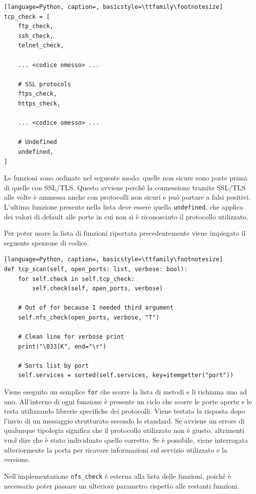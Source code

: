 \documentclass[12pt]{report}
\begin{document}
\begin{lstlisting}[language=Python, caption=, basicstyle=\ttfamily\footnotesize]
tcp_check = [
    ftp_check,
    ssh_check,
    telnet_check,
    
    ... <codice omesso> ...
    
    # SSL protocols
    ftps_check,
    https_check,
    
    ... <codice omesso> ...

    # Undefined
    undefined,
]
\end{lstlisting} 

Le funzioni sono ordinate nel seguente modo: quelle non sicure sono poste prima di quelle con SSL/TLS. Questo avviene perché la connessione tramite SSL/TLS alle volte è ammessa anche con protocolli non sicuri e può portare a falsi positivi. L'ultima funzione presente nella lista deve essere quella \lstinline{undefined}, che applica dei valori di default alle porte in cui non si è riconosciuto il protocollo utilizzato.

Per poter usare la lista di funzioni riportata precedentemente viene impiegato il seguente spezzone di codice.

\begin{lstlisting}[language=Python, caption=, basicstyle=\ttfamily\footnotesize]
def tcp_scan(self, open_ports: list, verbose: bool):
    for self.check in self.tcp_check:
        self.check(self, open_ports, verbose)

    # Out of for because I needed third argument
    self.nfs_check(open_ports, verbose, "T")

    # Clean line for verbose print
    print("\033[K", end="\r")

    # Sorts list by port
    self.services = sorted(self.services, key=itemgetter("port"))
\end{lstlisting}

Viene eseguito un semplice \lstinline{for} che scorre la lista di metodi e li richiama uno ad uno. All'interno di ogni funzione è presente un ciclo che scorre le porte aperte e le testa utilizzando librerie specifiche dei protocolli. Viene testata la risposta dopo l'invio di un messaggio strutturato secondo lo standard. Se avviene un errore di qualunque tipologia significa che il protocollo utilizzato non è giusto, altrimenti vuol dire che è stato individuato quello corretto. Se è possibile, viene interrogata ulteriormente la porta per ricavare informazioni sul servizio utilizzato e la versione. 

Nell'implementazione \lstinline{nfs_check} è esterna alla lista delle funzioni, poiché è necessario poter passare un ulteriore parametro rispetto alle restanti funzioni.
\end{document}
